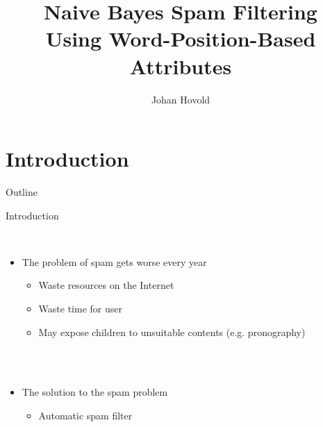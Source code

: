 \documentclass[]{beamer}
\title{Naive Bayes Spam Filtering\\Using Word-Position-Based Attributes}    %
\author{Johan Hovold}                 %
\institute{Dejun Qian}      %
\date{}                    %
\begin{document}
\begin{frame}
  \titlepage
\end{frame}

\section{Introduction}
\begin{frame}[t]{\centerline{Outline}}
  \tableofcontents
\end{frame}
\note{}

\begin{frame}[t]{\centerline{Introduction}}
  \ \\
  \begin{itemize}
  \item The problem of spam gets worse every year
  \begin{itemize}
  \item Waste resources on the Internet
  \item Waste time for user
  \item May expose children to unsuitable contents (e.g. pronography)
  \end{itemize}
  \ \\
  \ \\
\pause
  \item The solution to the spam problem
  \begin{itemize}
  \item Automatic spam filter
  \end{itemize}
  \end{itemize}
\end{frame}
\note{}

\end{document}
